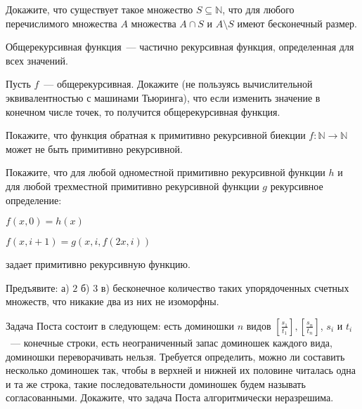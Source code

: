 
\newcommand{\dom}[2]{\left[\frac{#1}{#2}\right]}


\begin{task}
    Докажите, что существует такое множество $S \subseteq \mathbb{N}$, что для любого перечислимого множества $A$ множества $A
    \cap S$ и $A \setminus S$ имеют бесконечный размер.
\end{task}

Общерекурсивная функция~--- частично рекурсивная функция, определенная для всех значений.

\begin{task}
    Пусть $f$~--- общерекурсивная. Докажите (не пользуясь вычислительной эквивалентностью с машинами Тьюринга), что если изменить
    значение в конечном числе точек, то получится общерекурсивная функция.
\end{task}

\begin{task}
    Покажите, что функция обратная к примитивно рекурсивной биекции $f: \mathbb{N} \rightarrow \mathbb{N}$ может не быть
    примитивно рекурсивной.
\end{task}

\begin{task}
    Покажите, что для любой одноместной примитивно рекурсивной функции $h$ и для любой трехместной примитивно рекурсивной функции
    $g$ рекурсивное определение:

    $f(x, 0) = h(x)$

    $f(x, i + 1) = g(x, i, f(2 x, i))$

    задает примитивно рекурсивную функцию.
\end{task}

\begin{task}
	Предъявите: а) $2$ б) $3$ в) бесконечное количество таких упорядоченных счетных множеств, что никакие два из них не изоморфны.
\end{task}

\breakline

\begin{ptask}{21}
	Задача Поста состоит в следующем: есть доминошки $n$ видов $\dom{s_1}{t_1}, \dom{s_n}{t_n}$, $s_i$ и $t_i$~--- конечные
    строки, есть неограниченный запас доминошек каждого вида, доминошки переворачивать нельзя. Требуется определить, можно ли
    составить несколько доминошек так, чтобы в верхней и нижней их половине читалась одна и та же строка, такие последовательности
    доминошек будем называть согласованными. Докажите, что задача Поста алгоритмически неразрешима.
\end{ptask}